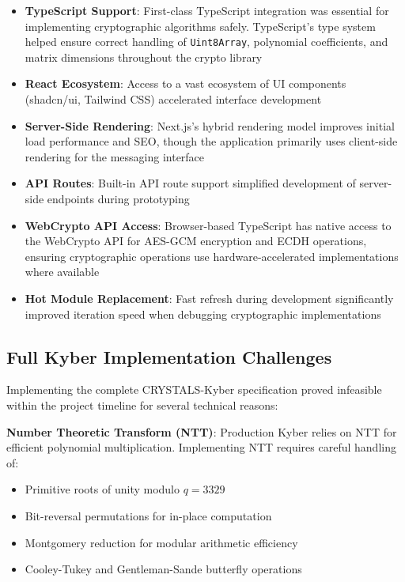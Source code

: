 \documentclass[11pt,a4paper]{article}
\begin{document}
\begin{itemize}
    \item \textbf{TypeScript Support}: First-class TypeScript integration was essential for implementing cryptographic algorithms safely. TypeScript's type system helped ensure correct handling of \texttt{Uint8Array}, polynomial coefficients, and matrix dimensions throughout the crypto library
    \item \textbf{React Ecosystem}: Access to a vast ecosystem of UI components (shadcn/ui, Tailwind CSS) accelerated interface development
    \item \textbf{Server-Side Rendering}: Next.js's hybrid rendering model improves initial load performance and SEO, though the application primarily uses client-side rendering for the messaging interface
    \item \textbf{API Routes}: Built-in API route support simplified development of server-side endpoints during prototyping
    \item \textbf{WebCrypto API Access}: Browser-based TypeScript has native access to the WebCrypto API for AES-GCM encryption and ECDH operations, ensuring cryptographic operations use hardware-accelerated implementations where available
    \item \textbf{Hot Module Replacement}: Fast refresh during development significantly improved iteration speed when debugging cryptographic implementations
\end{itemize}

\subsection{Full Kyber Implementation Challenges}

Implementing the complete CRYSTALS-Kyber specification proved infeasible within the project timeline for several technical reasons:

\textbf{Number Theoretic Transform (NTT)}: Production Kyber relies on NTT for efficient polynomial multiplication. Implementing NTT requires careful handling of:
\begin{itemize}
    \item Primitive roots of unity modulo $q = 3329$
    \item Bit-reversal permutations for in-place computation
    \item Montgomery reduction for modular arithmetic efficiency
    \item Cooley-Tukey and Gentleman-Sande butterfly operations
\end{itemize}
\end{document}
